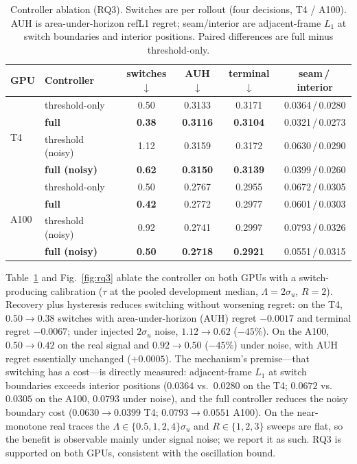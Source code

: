 \documentclass[journal]{IEEEtran}
\begin{document}
\begin{table}[!t]
\centering
\caption{Controller ablation (RQ3). Switches are per rollout (four decisions, T4 / A100). AUH is area-under-horizon refL1 regret; seam/interior are adjacent-frame $L_1$ at switch boundaries and interior positions. Paired differences are full minus threshold-only.}
\label{tab:rq3}
\renewcommand{\arraystretch}{1.12}
\footnotesize
\setlength{\tabcolsep}{3.5pt}
\begin{tabular}{@{}llcccc@{}}
\toprule
GPU & Controller & switches$\downarrow$ & AUH$\downarrow$ & terminal$\downarrow$ & seam\,/\,interior \\
\midrule
\multirow{4}{*}{T4}
 & threshold-only      & 0.50 & 0.3133 & 0.3171 & 0.0364\,/\,0.0280 \\
 & \textbf{full}       & \textbf{0.38} & \textbf{0.3116} & \textbf{0.3104} & 0.0321\,/\,0.0273 \\
 & threshold (noisy)   & 1.12 & 0.3159 & 0.3172 & 0.0630\,/\,0.0290 \\
 & \textbf{full (noisy)} & \textbf{0.62} & \textbf{0.3150} & \textbf{0.3139} & 0.0399\,/\,0.0260 \\
\midrule
\multirow{4}{*}{A100}
 & threshold-only      & 0.50 & 0.2767 & 0.2955 & 0.0672\,/\,0.0305 \\
 & \textbf{full}       & \textbf{0.42} & 0.2772 & 0.2977 & 0.0601\,/\,0.0303 \\
 & threshold (noisy)   & 0.92 & 0.2741 & 0.2997 & 0.0793\,/\,0.0326 \\
 & \textbf{full (noisy)} & \textbf{0.50} & \textbf{0.2718} & \textbf{0.2921} & 0.0551\,/\,0.0315 \\
\bottomrule
\end{tabular}
\end{table}

Table~\ref{tab:rq3} and Fig.~\ref{fig:rq3} ablate the controller on both GPUs with a switch-producing calibration ($\tau$ at the pooled development median, $\Lambda = 2\sigma_u$, $R{=}2$). Recovery plus hysteresis reduces switching without worsening regret: on the T4, $0.50 \rightarrow 0.38$ switches with area-under-horizon (AUH) regret $-0.0017$ and terminal regret $-0.0067$; under injected $2\sigma_u$ noise, $1.12 \rightarrow 0.62$ ($-45\%$). On the A100, $0.50 \rightarrow 0.42$ on the real signal and $0.92 \rightarrow 0.50$ ($-45\%$) under noise, with AUH regret essentially unchanged ($+0.0005$). The mechanism's premise---that switching has a cost---is directly measured: adjacent-frame $L_1$ at switch boundaries exceeds interior positions ($0.0364$ vs.\ $0.0280$ on the T4; $0.0672$ vs.\ $0.0305$ on the A100, $0.0793$ under noise), and the full controller reduces the noisy boundary cost ($0.0630 \rightarrow 0.0399$ T4; $0.0793 \rightarrow 0.0551$ A100). On the near-monotone real traces the $\Lambda \in \{0.5,1,2,4\}\sigma_u$ and $R \in \{1,2,3\}$ sweeps are flat, so the benefit is observable mainly under signal noise; we report it as such. RQ3 is supported on both GPUs, consistent with the oscillation bound.
\end{document}
